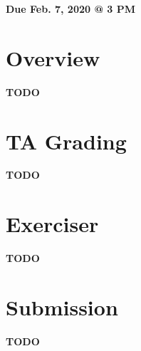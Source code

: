 \documentclass[11pt]{article}
\makeatletter
\def\datedue{Feb. 7, 2020 @ 3 PM}
\makeatother
\begin{document}
\maketitle \thispagestyle{fancy}

\hfill {\large \textbf{Due \datedue}}


\section{Overview}
\label{sec:overview}
\textbf{TODO}

\section{TA Grading}
\label{sec:tagrading}
\textbf{TODO}

\section{Exerciser}
\label{sec:exercise}
\textbf{TODO}

\section{Submission}
\label{sec:submission}
\textbf{TODO}
\end{document}
